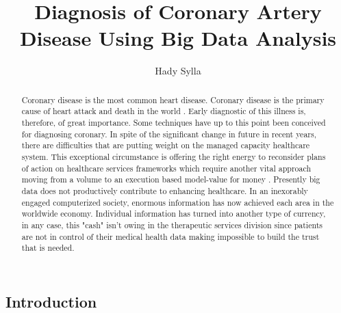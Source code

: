 \documentclass[sigconf]{acmart}
\begin{document}
\title{Diagnosis of Coronary Artery Disease Using Big Data Analysis}


\author{Hady Sylla}



\renewcommand{\shortauthors}{H. Sylla}


    
\begin{abstract}
Coronary disease is the most common heart disease. Coronary disease is the primary cause of heart attack and death in the world \cite{ali}. Early diagnostic of this illness is, therefore, of great importance. Some techniques have up to this point been conceived for diagnosing coronary. In spite of the significant change in future in recent years, there are difficulties that are putting weight on the managed capacity healthcare system. This exceptional circumstance is offering the right energy to reconsider plans of action on healthcare services frameworks which require another vital approach moving from a volume to an execution based model-value for money \cite{ali}.
Presently big data does not productively contribute to enhancing healthcare. In an inexorably engaged computerized society, enormous information has now achieved each area in the worldwide economy. Individual information has turned into another type of currency, in any case, this "cash" isn't owing in the therapeutic services division since patients are not in control of their medical health data making impossible to build the trust that is needed.
\end{abstract}




    \maketitle
    
\subsection{Introduction}
\end{document}

